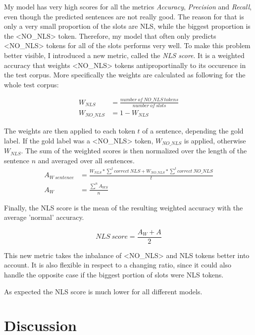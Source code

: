 \documentclass[
	11pt, %
]{fphw}
\begin{document}
My model has very high scores for all the metrics \emph{Accuracy}, \emph{Precision} and \emph{Recall}, even though the predicted sentences are not really good. The reason for that is only a very small proportion of the slots are NLS, while the biggest proportion is the <NO\_NLS> token. Therefore, my model that often only predicts <NO\_NLS> tokens for all of the slots performs very well. To make this problem better visible, I introduced a new metric, called the \emph{NLS score}. It is a weighted accuracy that weights <NO\_NLS> tokens antiproportinally to its occurence in the test corpus. More specifically the weights are calculated as following for the whole test corpus:

\begin{align}
    W_{NLS} &= \frac{number\ of\ NO\_NLS\ tokens}{number\ of\ slots} \\
    W_{NO\_NLS} &= 1 - W_{NLS}
\end{align}

The weights are then applied to each token $t$ of a sentence, depending the gold label. If the gold label was a <NO\_NLS> token, $W_{NO\_NLS}$ is applied, otherwise $W_{NLS}$. The sum of the weighted scores is then normalized over the length of the sentence $n$ and averaged over all sentences. 
\begin{align}
    A_{W\ sentence} &= \frac{W_{NLS} * \sum_{}^{t}{correct\ NLS} + W_{NO\_NLS} *\sum_{}^{t}{correct\ NO\_NLS}}{t} \\
    A_W &= \frac{\sum_{}^{n}A_{WS}}{n}
\end{align}

Finally, the NLS score is the mean of the resulting weighted accuracy with the average 'normal' accuracy.

\begin{equation}
    NLS\ score = \frac{A_W + A}{2}
\end{equation}

This new metric takes the inbalance of <NO\_NLS> and NLS tokens better into account. It is also flexible in respect to a changing ratio, since it could also handle the opposite case if the biggest portion of slots were NLS tokens.

As expected the NLS score is much lower for all different models.

\section*{Discussion}
\end{document}

